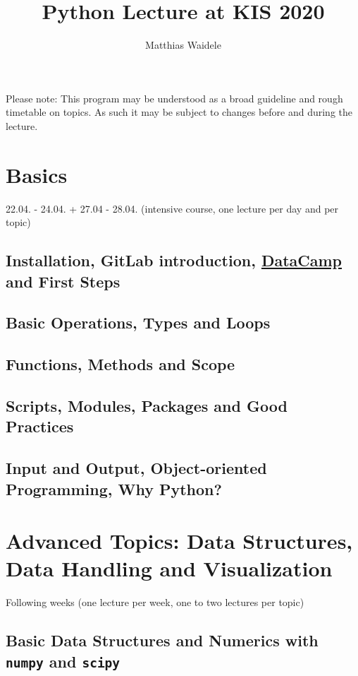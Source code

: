 \documentclass[10pt,a4paper]{article}
\begin{document}
	\title{Python Lecture at KIS 2020}
	\author{Matthias Waidele}
	\date{}
	
	\maketitle
	Please note: This program may be understood as a broad guideline and rough timetable on topics. As such it may be subject to changes before and during the lecture.
	
	\section{Basics}
	22.04. - 24.04. + 27.04 - 28.04. (intensive course, one lecture per day and per topic)
	
		\subsection{Installation, GitLab introduction, \href{https://learn.datacamp.com/}{DataCamp} and First Steps}
		\subsection{Basic Operations, Types and Loops}
		\subsection{Functions, Methods and Scope}
		\subsection{Scripts, Modules, Packages and Good Practices}
		\subsection{Input and Output, Object-oriented Programming, Why Python?}
	
	\vspace{1cm}
	\section{Advanced Topics: Data Structures, Data Handling and Visualization}
	Following weeks (one lecture per week, one to two lectures per topic)
		
		\subsection{Basic Data Structures and Numerics with \texttt{numpy} and \texttt{scipy}}
\end{document}

